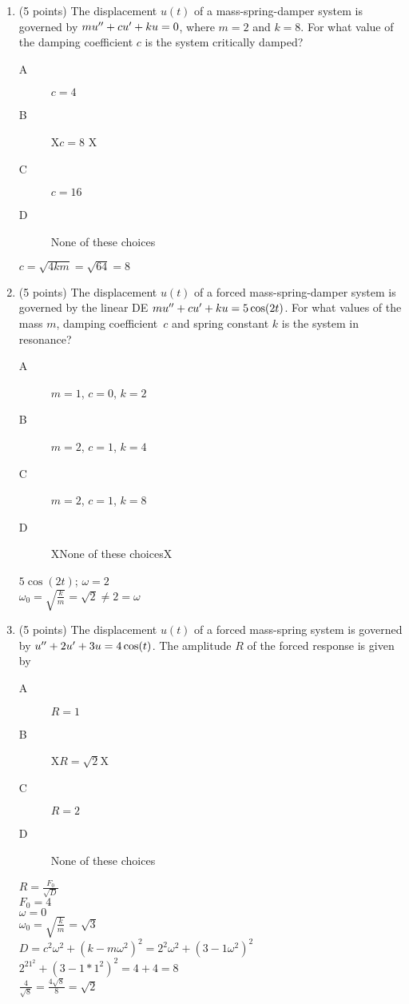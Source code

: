 \documentclass{article}
\begin{document}
\begin{enumerate}
\item (5 points) The displacement $u(t)$ of a mass-spring-damper system is governed by $mu\sp{\prime\prime} + cu\sp\prime + ku = 0$, where $m=2$ and $k=8$.  For what value of the damping coefficient $c$ is the system critically damped? 
\begin{description}
\item[A] $c=4$
\item[B] X$c=8$	X
\item[C] $c=16$
\item[D] None of these choices
\end{description}
$c=\sqrt{4km}=\sqrt{64}=8$

\item (5 points) The displacement $u(t)$ of a forced mass-spring-damper system is governed by the linear DE $mu\sp{\prime\prime} + cu\sp\prime + ku = 5\cos(2t)$.  For what values of the mass $m$, damping coefficient~$c$ and spring constant $k$ is the system in resonance? 
\begin{description}
\item[A] $m=1$, $c=0$, $k=2$
\item[B] $m=2$, $c=1$, $k=4$
\item[C] $m=2$, $c=1$, $k=8$
\item[D] XNone of these choicesX
\end{description}
$5\cos(2t)$; $\omega=2$
\\$\omega_0=\sqrt{\frac{k}{m}}=\sqrt{2}\ne2=\omega$

\newpage
\item (5 points) The displacement $u(t)$ of a forced mass-spring system is governed by $u\sp{\prime\prime} + 2u\sp{\prime} +3u = 4\cos(t)$.  The amplitude $R$ of the forced  response is given by
\begin{description}
\item[A]  $R=1$
\item[B]  X$R=\sqrt2$X
\item[C]  $R=2$  
\item[D] None of these choices
\end{description}
$R=\frac{F_0}{\sqrt{D}}$
\\$F_0=4$
\\$\omega=0$
\\$\omega_0=\sqrt{\frac{k}{m}}=\sqrt{3}$
\\$D=c^2\omega^2+(k-m\omega^2)^2=2^2\omega^2+(3-1\omega^2)^2$
\\$2^21^2+(3-1*1^2)^2=4+4=8$
\\$\frac{4}{\sqrt{8}}=\frac{4\sqrt{8}}{8}=\sqrt{2}$
\end{enumerate}
\end{document}
